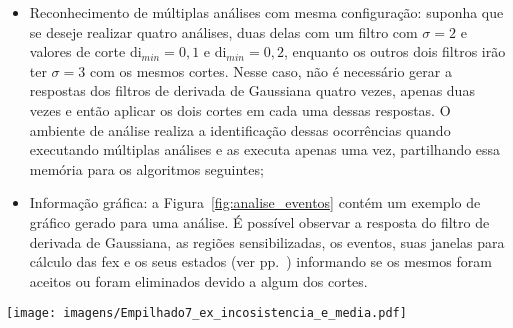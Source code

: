 \begin{itemize}
\item Reconhecimento de múltiplas análises com mesma configuração:
suponha que se deseje realizar quatro análises, duas delas com um filtro com
$\sigma=2$ e valores de corte \acs{di}$_{min}=0,1$ e
\acs{di}$_{min}=0,2$, enquanto os outros dois filtros irão ter 
$\sigma=3$ com os mesmos cortes. Nesse caso, não é necessário gerar a
respostas dos filtros de derivada de Gaussiana quatro vezes, apenas
duas vezes e então aplicar os dois cortes em cada uma dessas
respostas. O ambiente de análise realiza a identificação dessas
ocorrências quando executando múltiplas análises e as executa apenas
uma vez, partilhando essa memória para os algoritmos seguintes; 

\item Informação gráfica: a Figura~\ref{fig:analise_eventos} contém um
exemplo de gráfico gerado para uma análise. É possível observar a
resposta do filtro de derivada de Gaussiana, as regiões
sensibilizadas, os eventos, suas janelas para cálculo das \acs{fex} e
os seus estados (ver pp.~\pageref{text:estados_eventos}) informando se
os mesmos foram aceitos ou foram eliminados devido a algum dos cortes.

\end{itemize}


\begin{sidewaysfigure}[p]
\centering
\texttt{[image: imagens/Empilhado7\_ex\_incosistencia\_e\_media.pdf]}
\caption[Exemplo de informação gráfica para o Módulo de Análise dos
Dados.]{Exemplo de informação gráfica para o Módulo de Análise dos
Dados. Na subfigura inferior, as regiões verdes e vermelhas indicam
regiões sensibilizadas por respostas positivas e negativas,
respectivamente. A resposta para o filtro de
derivada de Gaussiana é representado pela linha pontilhada, enquanto a
linha horizontal cinza é o limear de corte para a geração de uma região
sensibilizada. É possível observar um caso de evento incosistente e
outro removido devido a evento próximo. Para o caso do evento inconsistente, em azul, seu
degrau de potência é positivo enquanto sua resposta é negativa,
revelando sua incosistência. Já os eventos próximos representados
pelas caixas amarelas foram removidos por estarem próximos, sendo
substituídos pela sua média (a linha verde). Nessa figura também é possível observar
as regiões que serão utilizadas para a extração do transitório (região
cinza) e as regiões utilizadas para calcular o degrau de potência
(regiões amarelas pré/pós-transitório). }
\label{fig:analise_eventos}
\end{sidewaysfigure}


